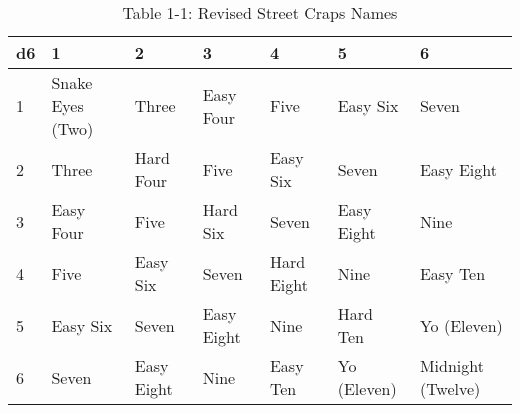 \begin{table}
    \centering
    \begin{tabular}{|l|l|l|l|l|l|l|}
    \hline
        d6 & 1 & 2 & 3 & 4 & 5 & 6 \\ \hline
        1 & Snake Eyes (Two) & Three & Easy Four & Five & Easy Six & Seven \\ \hline
        2 & Three & Hard Four & Five & Easy Six & Seven & Easy Eight \\ \hline
        3 & Easy Four & Five & Hard Six & Seven & Easy Eight & Nine \\ \hline
        4 & Five & Easy Six & Seven & Hard Eight & Nine & Easy Ten \\ \hline
        5 & Easy Six & Seven & Easy Eight & Nine & Hard Ten & Yo (Eleven) \\ \hline
        6 & Seven & Easy Eight & Nine & Easy Ten & Yo (Eleven) & Midnight (Twelve) \\ \hline
    \end{tabular}
    \caption{Table 1-1: Revised Street Craps Names}
    \label{table1-1}
\end{table}
